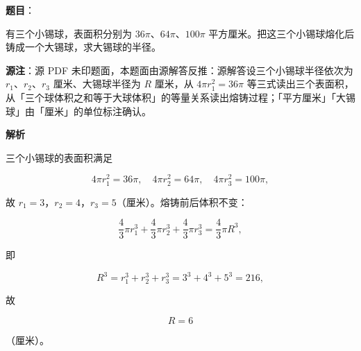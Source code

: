 \begin{answer}

\textbf{题目}：

有三个小锡球，表面积分别为 $36\pi$、$64\pi$、$100\pi$ 平方厘米。把这三个小锡球熔化后铸成一个大锡球，求大锡球的半径。

\begin{gktip}
\textbf{源注}：源 PDF 未印题面，本题面由源解答反推：源解答设三个小锡球半径依次为 $r_1$、$r_2$、$r_3$ 厘米、大锡球半径为 $R$ 厘米，从 $4\pi r_1^2=36\pi$ 等三式读出三个表面积，从「三个球体积之和等于大球体积」的等量关系读出熔铸过程；「平方厘米」「大锡球」由「厘米」的单位标注确认。
\end{gktip}

\textbf{解析}

三个小锡球的表面积满足

\nopagebreak[4]
\[
4\pi r_1^2=36\pi,
\quad
4\pi r_2^2=64\pi,
\quad
4\pi r_3^2=100\pi,
\]

故 $r_1=3$，$r_2=4$，$r_3=5$（厘米）。熔铸前后体积不变：

\nopagebreak[4]
\[
\frac43\pi r_1^3+\frac43\pi r_2^3+\frac43\pi r_3^3=\frac43\pi R^3,
\]

即

\nopagebreak[4]
\[
R^3=r_1^3+r_2^3+r_3^3=3^3+4^3+5^3=216,
\]

故

\nopagebreak[4]
\[
R=6
\]

（厘米）。


\end{answer}
